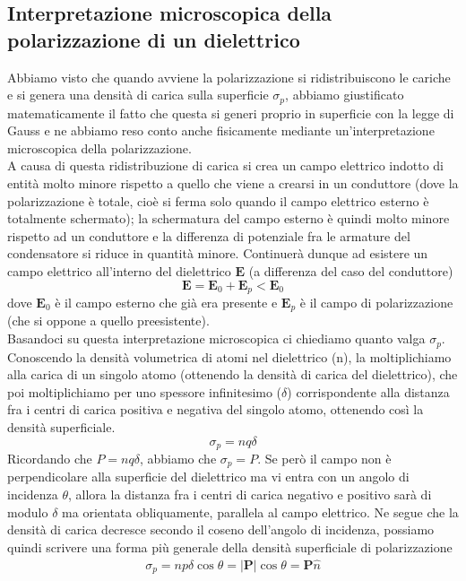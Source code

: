 \documentclass[
10pt, %
a4paper, %
oneside, %
headinclude,footinclude, %
BCOR5mm, %
]{scrartcl}
\begin{document}
\subsection{Interpretazione microscopica della polarizzazione di un dielettrico}
Abbiamo visto che quando avviene la polarizzazione si ridistribuiscono le cariche e si genera una densità di carica sulla superficie \(\sigma_p\), abbiamo giustificato matematicamente il fatto che questa si generi proprio in superficie con la legge di Gauss e ne abbiamo reso conto anche fisicamente mediante un'interpretazione microscopica della polarizzazione.\\
A causa di questa ridistribuzione di carica si crea un campo elettrico indotto di entità molto minore rispetto a quello che viene a crearsi in un conduttore (dove la polarizzazione è totale, cioè si ferma solo quando il campo elettrico esterno è totalmente schermato); la schermatura del campo esterno è quindi molto minore rispetto ad un conduttore e la differenza di potenziale fra le armature del condensatore si riduce in quantità minore. Continuerà dunque ad esistere un campo elettrico all'interno del dielettrico $\mathbf{E}$ (a differenza del caso del conduttore)
\[\mathbf{E} = \mathbf{E}_0+\mathbf{E}_p<\mathbf{E}_0\]
dove $\mathbf{E}_0$ è il campo esterno che già era presente e $\mathbf{E}_p$ è il campo di polarizzazione (che si oppone a quello preesistente).\\
Basandoci su questa interpretazione microscopica ci chiediamo quanto valga $\sigma_p$. Conoscendo la densità volumetrica di atomi nel dielettrico (n), la moltiplichiamo alla carica di un singolo atomo (ottenendo la densità di carica del dielettrico), che poi moltiplichiamo per uno spessore infinitesimo (\(\delta\)) corrispondente alla distanza fra i centri di carica positiva e negativa del singolo atomo, ottenendo così la densità superficiale.
\[\sigma_p = n q \delta\]
Ricordando che \(P = nq\delta\), abbiamo che $\sigma_p = P$. Se però il campo non è perpendicolare alla superficie del dielettrico ma vi entra con un angolo di incidenza $\theta$, allora la distanza fra i centri di carica negativo e positivo sarà di modulo $\delta$ ma orientata obliquamente, parallela al campo elettrico. Ne segue che la densità di carica decresce secondo il coseno dell'angolo di incidenza, possiamo quindi scrivere una forma più generale della densità superficiale di polarizzazione
\begin{align}\label{eq:densità_polarizzazione}
	\sigma_p = np\delta \cos\theta= |\mathbf{P}|\cos\theta = \mathbf{P}\hat{n}
\end{align}
\end{document}
